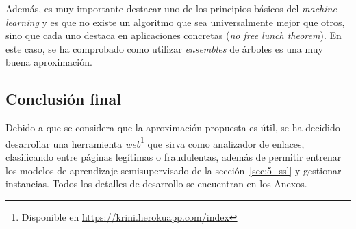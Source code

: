 Además, es muy importante destacar uno de los principios básicos del \textit{machine learning} y es que no existe un algoritmo que sea universalmente mejor que otros, sino que cada uno destaca en aplicaciones concretas (\textit{no free lunch theorem}). En este caso, se ha comprobado como utilizar \textit{ensembles} de árboles es una muy buena aproximación.

\subsection{Conclusión final}

Debido a que se considera que la aproximación propuesta es útil, se ha decidido desarrollar una herramienta \textit{web}\footnote{Disponible en \url{https://krini.herokuapp.com/index}} que sirva como analizador de enlaces, clasificando entre páginas legítimas o fraudulentas, además de permitir entrenar los modelos de aprendizaje semisupervisado de la sección~\ref{sec:5_ssl} y gestionar instancias. Todos los detalles de desarrollo se encuentran en los Anexos.